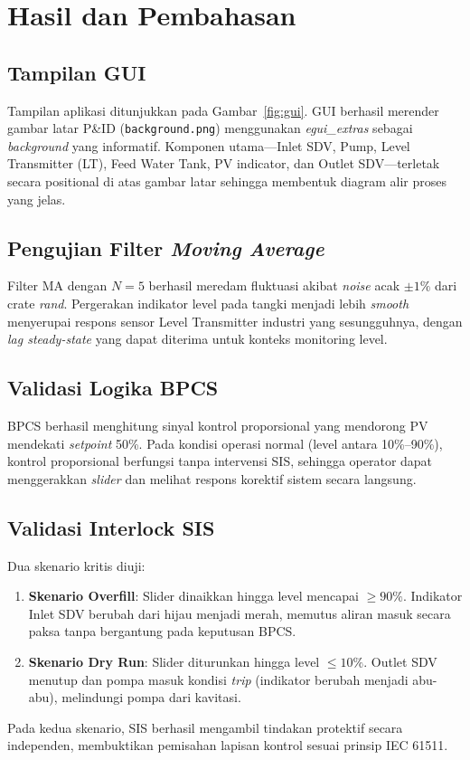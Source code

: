 \documentclass[12pt,a4paper]{article}
\begin{document}
\section{Hasil dan Pembahasan}

\subsection{Tampilan GUI}
Tampilan aplikasi ditunjukkan pada Gambar~\ref{fig:gui}. GUI berhasil
merender gambar latar P\&ID (\texttt{background.png}) menggunakan
\textit{egui\_extras} sebagai \textit{background} yang informatif.
Komponen utama---Inlet SDV, Pump, Level Transmitter (LT), Feed Water Tank,
PV indicator, dan Outlet SDV---terletak secara positional di atas gambar
latar sehingga membentuk diagram alir proses yang jelas.

\subsection{Pengujian Filter \textit{Moving Average}}
Filter MA dengan $N=5$ berhasil meredam fluktuasi akibat \textit{noise}
acak $\pm 1\%$ dari crate \textit{rand}. Pergerakan indikator level pada
tangki menjadi lebih \textit{smooth} menyerupai respons sensor Level
Transmitter industri yang sesungguhnya, dengan \textit{lag steady-state}
yang dapat diterima untuk konteks monitoring level.

\subsection{Validasi Logika BPCS}
BPCS berhasil menghitung sinyal kontrol proporsional yang mendorong PV
mendekati \textit{setpoint} 50\%. Pada kondisi operasi normal (level antara
10\%--90\%), kontrol proporsional berfungsi tanpa intervensi SIS, sehingga
operator dapat menggerakkan \textit{slider} dan melihat respons korektif
sistem secara langsung.

\subsection{Validasi Interlock SIS}
Dua skenario kritis diuji:
\begin{enumerate}
    \item \textbf{Skenario Overfill}: Slider dinaikkan hingga level mencapai
          $\geq 90\%$. Indikator Inlet SDV berubah dari hijau menjadi merah,
          memutus aliran masuk secara paksa tanpa bergantung pada keputusan
          BPCS.
    \item \textbf{Skenario Dry Run}: Slider diturunkan hingga level
          $\leq 10\%$. Outlet SDV menutup dan pompa masuk kondisi
          \textit{trip} (indikator berubah menjadi abu-abu), melindungi
          pompa dari kavitasi.
\end{enumerate}
Pada kedua skenario, SIS berhasil mengambil tindakan protektif secara
independen, membuktikan pemisahan lapisan kontrol sesuai prinsip IEC 61511.
\end{document}
